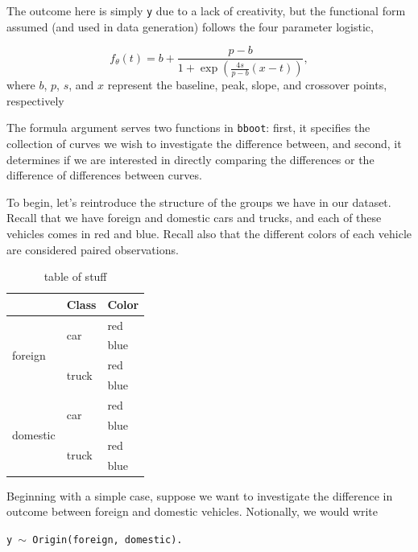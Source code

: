 \documentclass{article}
\newcommand{\xt}{\texttt}%
\begin{document}
The outcome here is simply \xt{y} due to a lack of creativity, but the functional form assumed (and used in data generation) follows the four parameter logistic, 

\begin{equation}
f_{\theta}(t) = b + \frac{p-b}{1 + \exp \left( \frac{4s}{p-b} (x-t) \right)},
\end{equation}
where $b$, $p$, $s$, and $x$ represent the baseline, peak, slope, and crossover points, respectively



The formula argument serves two functions in \xt{bboot}: first, it specifies the collection of curves we wish to investigate the difference between, and second, it determines if we are interested in directly comparing the differences or the difference of differences between curves. 

To begin, let's reintroduce the structure of the groups we have in our dataset. Recall that we have foreign and domestic cars and trucks, and each of these vehicles comes in red and blue. Recall also that the different colors of each vehicle are considered paired observations.

\begin{table}
\centering
\def\arraystretch{1.5}
\begin{tabular}{|p{0.9in}|p{0.9in}|p{0.9in}|} \hline 
\rowcolor{lightgray} \multicolumn{1}{|c|}{Origin} & \multicolumn{1}{c|}{Class} & \multicolumn{1}{c|}{Color}\\
\hline
\multirow{4}{*}{foreign} & \multirow{2}{*}{car} & red \\
\hhline{~~-}
& & blue \\
\hhline{~--}
& \multirow{2}{*}{truck} & red \\
\hhline{~~-}
& & blue \\
\hline
\multirow{4}{*}{domestic} & \multirow{2}{*}{car} & red \\
\hhline{~~-}
& & blue \\
\hhline{~--}
& \multirow{2}{*}{truck} & red \\
\hhline{~~-}
& & blue \\
\hline
\end{tabular}
\caption{table of stuff}
\label{tab:group_table}
\end{table}


Beginning with a simple case, suppose we want to investigate the difference in outcome between foreign and domestic vehicles. Notionally, we would write

\begin{center}
\tt y $\sim$ Origin(foreign, domestic).
\end{center}
\end{document}
